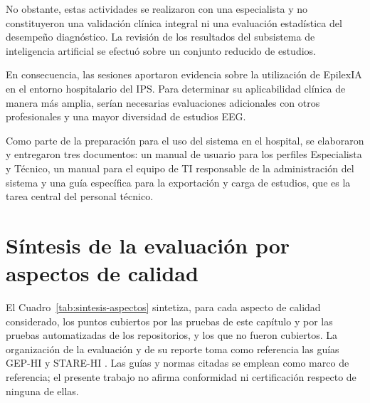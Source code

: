 No obstante, estas actividades se realizaron con una especialista y no constituyeron una validación clínica integral ni una evaluación estadística del desempeño diagnóstico. La revisión de los resultados del subsistema de inteligencia artificial se efectuó sobre un conjunto reducido de estudios.

En consecuencia, las sesiones aportaron evidencia sobre la utilización de EpilexIA en el entorno hospitalario del IPS. Para determinar su aplicabilidad clínica de manera más amplia, serían necesarias evaluaciones adicionales con otros profesionales y una mayor diversidad de estudios EEG.

Como parte de la preparación para el uso del sistema en el hospital, se elaboraron y entregaron tres documentos: un manual de usuario para los perfiles Especialista y Técnico, un manual para el equipo de TI responsable de la administración del sistema y una guía específica para la exportación y carga de estudios, que es la tarea central del personal técnico.


\section{Síntesis de la evaluación por aspectos de calidad}
\label{sec:sintesis-aspectos}

El Cuadro~\ref{tab:sintesis-aspectos} sintetiza, para cada aspecto de calidad considerado, los puntos cubiertos por las pruebas de este capítulo y por las pruebas automatizadas de los repositorios, y los que no fueron cubiertos.
La organización de la evaluación y de su reporte toma como referencia las guías GEP-HI \citep{Nykanen2011GEPHI} y STARE-HI \citep{Talmon2009STAREHI}.
Las guías y normas citadas se emplean como marco de referencia; el presente trabajo no afirma conformidad ni certificación respecto de ninguna de ellas.

